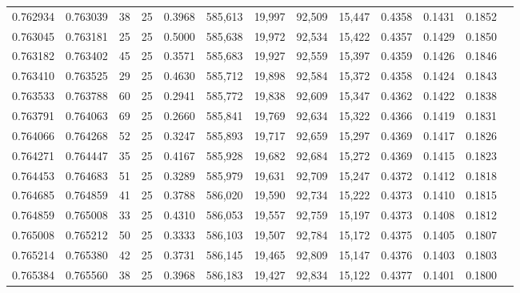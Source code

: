 \begin{tabular}{rrrrrrrrrrrrr}
0.762934 & 0.763039 &    38 &  25 &                                     0.3968 & 585,613 &  19,997 &  92,509 &  15,447 & 0.4358 & 0.1431 & 0.1852 \\
0.763045 & 0.763181 &    25 &  25 &                                     0.5000 & 585,638 &  19,972 &  92,534 &  15,422 & 0.4357 & 0.1429 & 0.1850 \\
0.763182 & 0.763402 &    45 &  25 &                                     0.3571 & 585,683 &  19,927 &  92,559 &  15,397 & 0.4359 & 0.1426 & 0.1846 \\
0.763410 & 0.763525 &    29 &  25 &                                     0.4630 & 585,712 &  19,898 &  92,584 &  15,372 & 0.4358 & 0.1424 & 0.1843 \\
0.763533 & 0.763788 &    60 &  25 &                                     0.2941 & 585,772 &  19,838 &  92,609 &  15,347 & 0.4362 & 0.1422 & 0.1838 \\
0.763791 & 0.764063 &    69 &  25 &                                     0.2660 & 585,841 &  19,769 &  92,634 &  15,322 & 0.4366 & 0.1419 & 0.1831 \\
0.764066 & 0.764268 &    52 &  25 &                                     0.3247 & 585,893 &  19,717 &  92,659 &  15,297 & 0.4369 & 0.1417 & 0.1826 \\
0.764271 & 0.764447 &    35 &  25 &                                     0.4167 & 585,928 &  19,682 &  92,684 &  15,272 & 0.4369 & 0.1415 & 0.1823 \\
0.764453 & 0.764683 &    51 &  25 &                                     0.3289 & 585,979 &  19,631 &  92,709 &  15,247 & 0.4372 & 0.1412 & 0.1818 \\
0.764685 & 0.764859 &    41 &  25 &                                     0.3788 & 586,020 &  19,590 &  92,734 &  15,222 & 0.4373 & 0.1410 & 0.1815 \\
0.764859 & 0.765008 &    33 &  25 &                                     0.4310 & 586,053 &  19,557 &  92,759 &  15,197 & 0.4373 & 0.1408 & 0.1812 \\
0.765008 & 0.765212 &    50 &  25 &                                     0.3333 & 586,103 &  19,507 &  92,784 &  15,172 & 0.4375 & 0.1405 & 0.1807 \\
0.765214 & 0.765380 &    42 &  25 &                                     0.3731 & 586,145 &  19,465 &  92,809 &  15,147 & 0.4376 & 0.1403 & 0.1803 \\
0.765384 & 0.765560 &    38 &  25 &                                     0.3968 & 586,183 &  19,427 &  92,834 &  15,122 & 0.4377 & 0.1401 & 0.1800 \\

\end{tabular}
